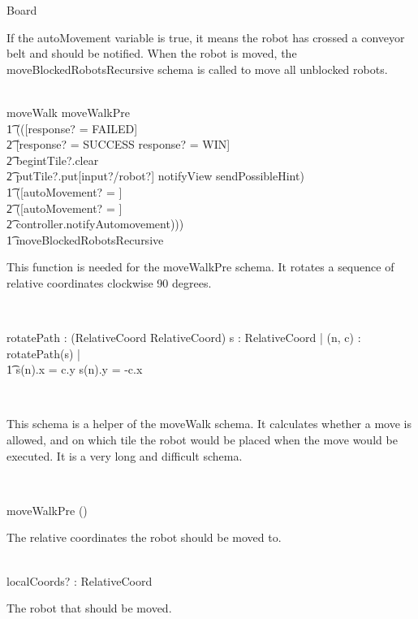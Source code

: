 \begin{class}{Board}
\begin{zpar}
If the autoMovement variable is true, it means the robot has crossed a conveyor belt and should be notified. When the robot is moved, the moveBlockedRobotsRecursive schema is called to move all unblocked robots.
\end{zpar} \\
moveWalk \sdef moveWalkPre \; \; \comp \\ \t1 (([response? = FAILED] \; \; [] \\ \t2 [response? = SUCCESS \vee response? = WIN] \;\; \wedge \\ \t2 begintTile?.clear \; \; \wedge \\ \t2 putTile?.put[input?/robot?] \wedge notifyView \wedge sendPossibleHint) \; \; \wedge \\ \t1 ([autoMovement? = \false] \; \; [] \\ \t2 ([autoMovement? = \true] \; \; \wedge \\ \t2 controller.notifyAutomovement))) \; \; \comp \\ \t1
moveBlockedRobotsRecursive \\
\begin{zpar}
This function is needed for the moveWalkPre schema. It rotates a sequence of relative coordinates clockwise 90 degrees.
\end{zpar} \\
\begin{axdef}
rotatePath : \power (\seq RelativeCoord \fun \seq RelativeCoord)
\where
\forall s : \seq RelativeCoord | \forall (n, c) : rotatePath(s) | \\ \t1
s(n).x = c.y \wedge s(n).y = -c.x
\end{axdef} \\
\begin{zpar}
This schema is a helper of the moveWalk schema. It calculates whether a move is allowed, and on which tile the robot would be placed when the move would be executed. It is a very long and difficult schema.
\end{zpar} \\
\begin{nobottomschema}{moveWalkPre}
\Delta() \\
\begin{zpar}
The relative coordinates the robot should be moved to.
\end{zpar} \\
localCoords? : RelativeCoord \\
\begin{zpar}
The robot that should be moved.
\end{zpar} \\

\end{nobottomschema}
\end{class}
